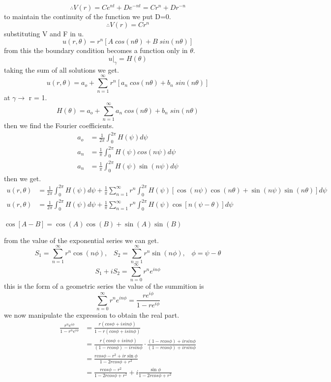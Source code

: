 \documentclass[]{article}
\begin{document}
\[
\therefore V(r) = Ce^{nt}+De^{-nt} = Cr^n+Dr^{-n}    
\]
to maintain the continuity of the function we put D=0.
\[
\therefore V(r) = Cr^n
\]
substituting V and F in u.
\begin{equation}
u(r,\theta) = r^n[A\;cos(n\theta)+B\;sin(n\theta)]
\end{equation}
from this the boundary condition becomes a function only in $\theta$.
\begin{equation}
u|_\gamma = H(\theta)
\end{equation}
taking the sum of all solutions we get.
\[
    u(r,\theta) = a_o + \sum_{n=1}^{\infty} r^n[a_n\;cos(n\theta)+b_n\;sin(n\theta)]    
\]
at $\gamma \longrightarrow $ r = 1.
\[
    H(\theta) = a_o + \sum_{n=1}^{\infty} a_n\;cos(n\theta)+b_n\;sin(n\theta) 
\]
then we find the Fourier coefficients.
\begin{align*}
a_o &= \frac{1}{2\pi}\int_{0}^{2\pi} H(\psi ) d\psi 
\\
a_n &=\frac{1}{\pi}\int_{0}^{2\pi} H(\psi ) cos(n\psi ) d\psi 
\\
a_n &=\frac{1}{\pi}\int_{0}^{2\pi} H(\psi ) \sin(n\psi ) d\psi 
\end{align*}
then we get.
\begin{align*}
u(r,\theta) &= \frac{1}{2\pi}\int_{0}^{2\pi} H(\psi ) d\psi  + \frac{1}{\pi}\sum_{n=1}^{\infty} r^n \int_{0}^{2\pi} H(\psi )[\cos(n\psi )\cos(n\theta) + \sin(n\psi )\sin(n\theta)]d\psi 
\\
u(r,\theta) &= \frac{1}{2\pi}\int_{0}^{2\pi} H(\psi ) d\psi  + \frac{1}{\pi}\sum_{n=1}^{\infty}r^n\int_{0}^{2\pi} H(\psi )\cos[n(\psi  - \theta)]d\psi 
\end{align*}
\begin{enrichment*}{}
    $\cos[A-B] = \cos(A)\cos(B) + \sin(A)\sin(B)$
\end{enrichment*}
from the value of the exponential series we can get.
\[
    S_1 = \sum_{n=1}^{\infty} r^n \cos(n\phi),\;\;\; S_2 =\sum_{n=1}^{\infty}r^n \sin(n\phi), \;\;\; \phi = \psi  - \theta    
\]
\[
    S_1 + i S_2 = \sum_{n=0}^{\infty} r^n e^{in\phi}    
\]
this is the form of a geometric series the value of the summition is
\[
    \sum_{n=0}^{\infty} r^n e^{in\phi} = \frac{r e^{i\phi}}{1- r e^{i\phi}}
\]
we now manipulate the expression to obtain the real part.
\\
\begin{align*}
\frac{r^n e^{i\phi}}{1- r^n e^{i\phi}} &= \frac{r(cos\phi+isin\phi)}{1-r(cos\phi+isin\phi)}
\\
&= \frac{r(cos\phi+isin\phi)}{(1-rcos\phi)-irsin\phi} \cdot \frac{(1-rcos\phi)+irsin\phi}{(1-rcos\phi)+irsin\phi}
\\
&= \frac{rcos\phi - r^2 + ir \sin\phi}{1-2rcos\phi+r^2}
\\
&= \frac{rcos\phi - r^2}{1-2rcos\phi+r^2} + i \frac{\sin\phi}{1-2rcos\phi+r^2}
\end{align*}
\end{document}
